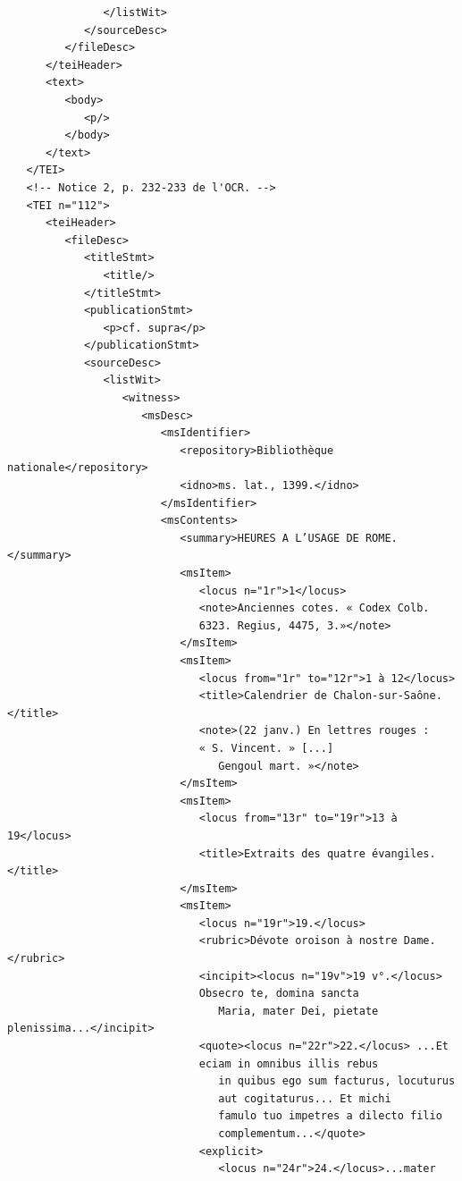 \documentclass[a4paper,12pt,twoside]{book}
\begin{document}
\begin{verbatim}
               </listWit>
            </sourceDesc>
         </fileDesc>
      </teiHeader>
      <text>
         <body>
            <p/>
         </body>
      </text>
   </TEI>
   <!-- Notice 2, p. 232-233 de l'OCR. -->
   <TEI n="112">
      <teiHeader>
         <fileDesc>
            <titleStmt>
               <title/>
            </titleStmt>
            <publicationStmt>
               <p>cf. supra</p>
            </publicationStmt>
            <sourceDesc>
               <listWit>
                  <witness>
                     <msDesc>
                        <msIdentifier>
                           <repository>Bibliothèque nationale</repository>
                           <idno>ms. lat., 1399.</idno>
                        </msIdentifier>
                        <msContents>
                           <summary>HEURES A L’USAGE DE ROME.</summary>
                           <msItem>
                              <locus n="1r">1</locus>
                              <note>Anciennes cotes. « Codex Colb.
                              6323. Regius, 4475, 3.»</note>
                           </msItem>
                           <msItem>
                              <locus from="1r" to="12r">1 à 12</locus>
                              <title>Calendrier de Chalon-sur-Saône.</title>
                              <note>(22 janv.) En lettres rouges : 
                              « S. Vincent. » [...]
                                 Gengoul mart. »</note>
                           </msItem>
                           <msItem>
                              <locus from="13r" to="19r">13 à 19</locus>
                              <title>Extraits des quatre évangiles.</title>
                           </msItem>
                           <msItem>
                              <locus n="19r">19.</locus>
                              <rubric>Dévote oroison à nostre Dame.</rubric>
                              <incipit><locus n="19v">19 v°.</locus>
                              Obsecro te, domina sancta
                                 Maria, mater Dei, pietate plenissima...</incipit>
                              <quote><locus n="22r">22.</locus> ...Et 
                              eciam in omnibus illis rebus
                                 in quibus ego sum facturus, locuturus 
                                 aut cogitaturus... Et michi
                                 famulo tuo impetres a dilecto filio 
                                 complementum...</quote>
                              <explicit>
                                 <locus n="24r">24.</locus>...mater

\end{verbatim}
\end{document}
